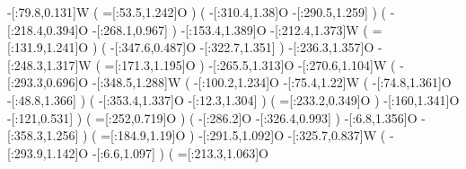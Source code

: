              -[:79.8,0.131]W%
                              (
                 =[:53.5,1.242]O%
                              )
                              (
                 -[:310.4,1.38]O%
                -[:290.5,1.259]\phantom{W}%
                              )
                              (
                -[:218.4,0.394]O%
                -[:268.1,0.967]\phantom{W}%
                              )
            -[:153.4,1.389]O%
            -[:212.4,1.373]W%
                              (
                =[:131.9,1.241]O%
                              )
                              (
                -[:347.6,0.487]O%
                -[:322.7,1.351]\phantom{W}%
                              )
            -[:236.3,1.357]O%
            -[:248.3,1.317]W%
                              (
                =[:171.3,1.195]O%
                              )
            -[:265.5,1.313]O%
            -[:270.6,1.104]W%
                              (
                -[:293.3,0.696]O%
                -[:348.5,1.288]W%
                                  (
                    -[:100.2,1.234]O%
                      -[:75.4,1.22]W%
                                      (
                         -[:74.8,1.361]O%
                         -[:48.8,1.366]\phantom{W}%
                                      )
                                      (
                        -[:353.4,1.337]O%
                         -[:12.3,1.304]\phantom{W}%
                                      )
                                      (
                        =[:233.2,0.349]O%
                                      )
                      -[:160,1.341]O%
                      -[:121,0.531]\phantom{W}%
                                  )
                                  (
                      =[:252,0.719]O%
                                  )
                                  (
                          -[:286.2]O%
                    -[:326.4,0.993]\phantom{W}%
                                  )
                  -[:6.8,1.356]O%
                -[:358.3,1.256]\phantom{W}%
                              )
                              (
                 =[:184.9,1.19]O%
                              )
            -[:291.5,1.092]O%
            -[:325.7,0.837]W%
                              (
                -[:293.9,1.142]O%
                  -[:6.6,1.097]\phantom{W}%
                              )
                              (
                =[:213.3,1.063]O%
